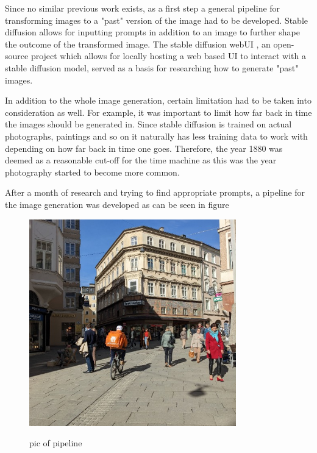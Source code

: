 \documentclass[english,notitlepage,smartquotes]{hgbreport}
\begin{document}
Since no similar previous work exists, as a first step a general pipeline for transforming images to a "past" version of the image had to be developed. Stable diffusion allows for inputting prompts in addition to an image to further shape the outcome of the transformed image. The stable diffusion webUI \cite{webui}, an open-source project which allows for locally hosting a web based UI to interact with a stable diffusion model, served as a basis for researching how to generate "past" images.

In addition to the whole image generation, certain limitation had to be taken into consideration as well. For example, it was important to limit how far back in time the images should be generated in. Since stable diffusion is trained on actual photographs, paintings and so on it naturally has less training data to work with depending on how far back in time one goes. Therefore, the year 1880 was deemed as a reasonable cut-off for the time machine as this was the year photography started to become more common.

After a month of research and trying to find appropriate prompts, a pipeline for the image generation was developed as can be seen in figure

\begin{figure}[htbp]
    \centering\small
    {\includegraphics[width=0.8\textwidth]{images/base_image_Salzburg.jpg}}
    \caption{pic of pipeline}
    \label{fig:simpPipeline}
\end{figure}
\end{document}
